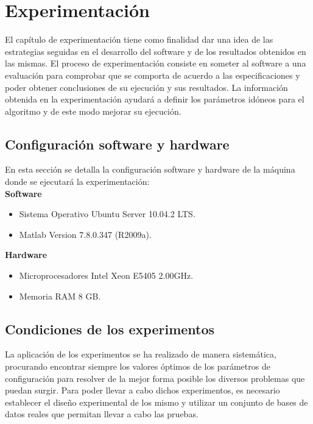 \chapter{Experimentación}
	
	El capítulo de experimentación tiene como finalidad dar una idea de las estrategias seguidas en el desarrollo del software y de los resultados obtenidos en las mismas. El proceso de experimentación consiste en someter al software a una evaluación para comprobar que se comporta de acuerdo a las especificaciones y poder obtener conclusiones de su ejecución y sus resultados. La información obtenida en la experimentación ayudará a definir los parámetros idóneos para el algoritmo y de este modo mejorar su ejecución.
	
	\section{Configuración software y hardware}
	
		En esta sección se detalla la configuración software y hardware de la máquina donde se ejecutará la experimentación:\\
		
		\textbf{Software}
		
		\begin{itemize}
			\item Sistema Operativo Ubuntu Server 10.04.2 LTS.
			\item Matlab Version 7.8.0.347 (R2009a).
		\end{itemize}
		
		\textbf{Hardware}
		
		\begin{itemize}
			\item Microprocesadores Intel Xeon E5405 2.00GHz.
			\item Memoria RAM 8 GB.
		\end{itemize}
	
	\section{Condiciones de los experimentos}
	
		La aplicación de los experimentos se ha realizado de manera sistemática, procurando encontrar siempre los valores óptimos de los parámetros de configuración para resolver de la mejor forma posible los diversos problemas que puedan surgir. Para poder llevar a cabo dichos experimentos, es necesario establecer el diseño experimental de los mismo y utilizar un conjunto de bases de datos reales que permitan llevar a cabo las pruebas.\\
	
